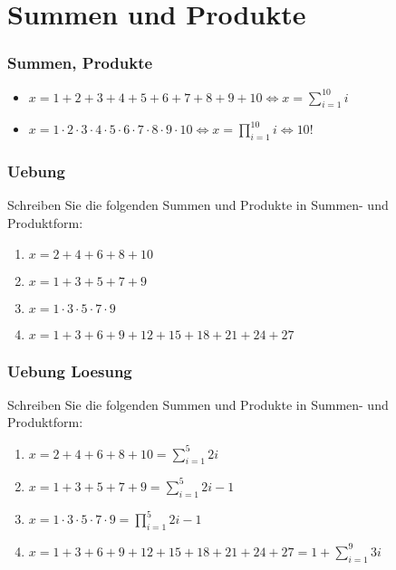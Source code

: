 \section{Summen und Produkte}
\begin{frame}
    \frametitle{Summen, Produkte}
    \begin{itemize}
        \vfill \item $x = 1+2+3+4+5+6+7+8+9+10 \iff x = \sum_{i=1}^{10} i$
        \vfill \item $x = 1 \cdot 2 \cdot 3 \cdot 4 \cdot 5 \cdot 6 \cdot 7 \cdot 8 \cdot 9 \cdot 10 \iff x = \prod_{i=1}^{10} i \iff 10!$
    \end{itemize}
\end{frame}

\begin{frame}
    \frametitle{Uebung}
    Schreiben Sie die folgenden Summen und Produkte in Summen- und Produktform:
    \begin{enumerate}
        \vfill \item $x = 2+4+6+8+10$
        \vfill \item $x = 1+3+5+7+9$
        \vfill \item $x = 1 \cdot 3 \cdot 5 \cdot 7 \cdot 9$
        \vfill \item $x = 1+3+6+9+12+15+18+21+24+27$
    \end{enumerate}
\end{frame}

\begin{frame}
    \frametitle{Uebung Loesung}
    Schreiben Sie die folgenden Summen und Produkte in Summen- und Produktform:
    \begin{enumerate}
        \vfill \item $x = 2+4+6+8+10 = \sum_{i=1}^{5} 2i$
        \vfill \item $x = 1+3+5+7+9 = \sum_{i=1}^{5} 2i-1$
        \vfill \item $x = 1 \cdot 3 \cdot 5 \cdot 7 \cdot 9 = \prod_{i=1}^{5} 2i-1$
        \vfill \item $x = 1+3+6+9+12+15+18+21+24+27 = 1 + \sum_{i=1}^{9} 3i$
    \end{enumerate}
\end{frame}
